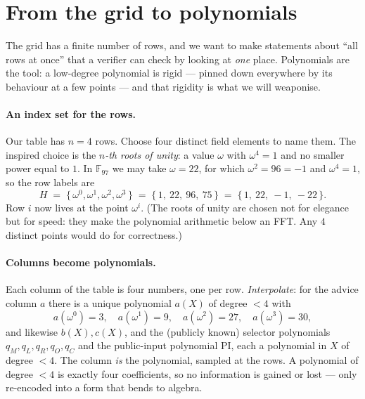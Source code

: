 \documentclass[11pt,a4paper]{article}
\theoremstyle{definition}
\newcommand{\F}{\mathbb{F}}
\begin{document}
\section{From the grid to polynomials}\label{sec:polys}

The grid has a finite number of rows, and we want to make statements about
``all rows at once'' that a verifier can check by looking at \emph{one} place.
Polynomials are the tool: a low-degree polynomial is rigid --- pinned down
everywhere by its behaviour at a few points --- and that rigidity is what we
will weaponise.

\paragraph{An index set for the rows.} Our table has $n = 4$ rows. Choose four
distinct field elements to name them. The inspired choice is the
\emph{$n$-th roots of unity}: a value $\omega$ with $\omega^4 = 1$ and no
smaller power equal to $1$. In $\F_{97}$ we may take $\omega = 22$, for which
$\omega^2 = 96 = -1$ and $\omega^4 = 1$, so the row labels are
\[
H \;=\; \{\,\omega^0, \omega^1, \omega^2, \omega^3\,\}
   \;=\; \{\,1,\ 22,\ 96,\ 75\,\}
   \;=\; \{\,1,\ 22,\ -1,\ -22\,\}.
\]
Row $i$ now lives at the point $\omega^i$. (The roots of unity are chosen not
for elegance but for speed: they make the polynomial arithmetic below an FFT.
Any $4$ distinct points would do for correctness.)

\paragraph{Columns become polynomials.} Each column of the table is four
numbers, one per row. \emph{Interpolate}: for the advice column $a$ there is a
unique polynomial $a(X)$ of degree $< 4$ with
\[
a(\omega^0) = 3,\quad a(\omega^1) = 9,\quad a(\omega^2) = 27,\quad a(\omega^3) = 30,
\]
and likewise $b(X), c(X)$, and the (publicly known) selector polynomials
$q_M, q_L, q_R, q_O, q_C$ and the public-input polynomial $\mathrm{PI}$, each a
polynomial in $X$ of degree $< 4$. The column \emph{is} the polynomial, sampled at the rows.
A polynomial of degree $< 4$ is exactly four coefficients, so no information is
gained or lost --- only re-encoded into a form that bends to algebra.
\end{document}
